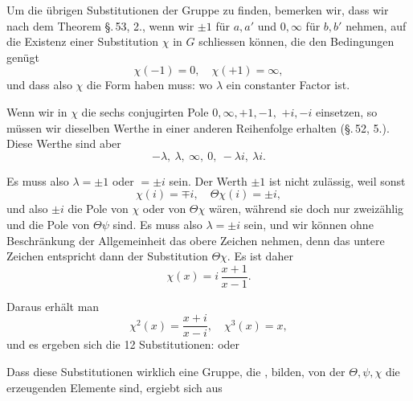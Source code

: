Um die übrigen Substitutionen der Gruppe zu finden, bemerken
 wir, dass wir nach dem Theorem \S.\,53, 2., wenn wir $\pm 1$
für $a, a'$ und $0, \infty$ für $b, b'$ nehmen, auf die Existenz einer Substitution
 $\chi$ in $G$ schliessen können, die den Bedingungen genügt
\[
\chi(-1) = 0, \quad \chi(+1) = \infty,
\]
und dass also $\chi$ die Form haben muss:
wo $\lambda$ ein constanter Factor ist.

Wenn wir in $\chi$ die sechs conjugirten Pole $0, \infty, +1, -1,$
$+i, -i$ einsetzen, so müssen wir dieselben Werthe in einer
anderen Reihenfolge erhalten (\S.\,52, 5.). Diese Werthe sind aber
\[
-\lambda,\ \lambda,\ \infty,\ 0,\ -\lambda i,\ \lambda i.
\]

Es muss also $\lambda = \pm 1$ oder $= \pm i$ sein. Der Werth $\pm 1$
ist nicht zulässig, weil sonst
\[
\chi(i) = \mp i, \quad \Theta\chi(i) = \pm i,
\]
und also $\pm i$ die Pole von $\chi$ oder von $\Theta\chi$ wären, während sie
doch nur zweizählig und die Pole von $\Theta\psi$ sind. Es muss also
$\lambda = \pm i$ sein, und wir können ohne Beschränkung der Allgemeinheit
 das obere Zeichen nehmen, denn das untere Zeichen
entspricht dann der Substitution $\Theta\chi$. Es ist daher
\[
\chi(x) = i\,\frac{x+1}{x-1}.
\]

Daraus erhält man
\[
\chi^2(x) = \frac{x+i}{x-i}, \quad \chi^3(x) = x,
\]
und es ergeben sich die 12 Substitutionen:
oder

Dass diese Substitutionen wirklich eine Gruppe, die ,
bilden, von der $\Theta, \psi, \chi$ die erzeugenden Elemente
sind, ergiebt sich aus
